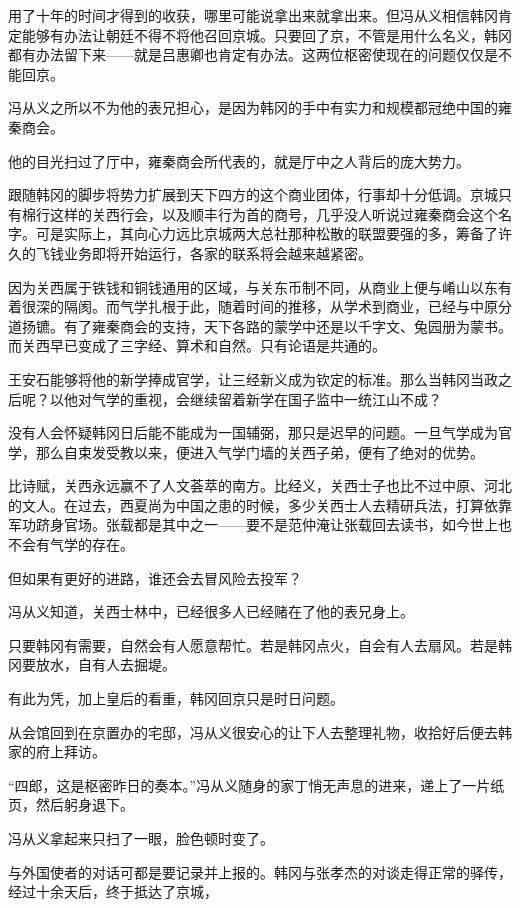 用了十年的时间才得到的收获，哪里可能说拿出来就拿出来。但冯从义相信韩冈肯定能够有办法让朝廷不得不将他召回京城。只要回了京，不管是用什么名义，韩冈都有办法留下来——就是吕惠卿也肯定有办法。这两位枢密使现在的问题仅仅是不能回京。

冯从义之所以不为他的表兄担心，是因为韩冈的手中有实力和规模都冠绝中国的雍秦商会。

他的目光扫过了厅中，雍秦商会所代表的，就是厅中之人背后的庞大势力。

跟随韩冈的脚步将势力扩展到天下四方的这个商业团体，行事却十分低调。京城只有棉行这样的关西行会，以及顺丰行为首的商号，几乎没人听说过雍秦商会这个名字。可是实际上，其向心力远比京城两大总社那种松散的联盟要强的多，筹备了许久的飞钱业务即将开始运行，各家的联系将会越来越紧密。

因为关西属于铁钱和铜钱通用的区域，与关东币制不同，从商业上便与崤山以东有着很深的隔阂。而气学扎根于此，随着时间的推移，从学术到商业，已经与中原分道扬镳。有了雍秦商会的支持，天下各路的蒙学中还是以千字文、兔园册为蒙书。而关西早已变成了三字经、算术和自然。只有论语是共通的。

王安石能够将他的新学捧成官学，让三经新义成为钦定的标准。那么当韩冈当政之后呢？以他对气学的重视，会继续留着新学在国子监中一统江山不成？

没有人会怀疑韩冈日后能不能成为一国辅弼，那只是迟早的问题。一旦气学成为官学，那么自束发受教以来，便进入气学门墙的关西子弟，便有了绝对的优势。

比诗赋，关西永远赢不了人文荟萃的南方。比经义，关西士子也比不过中原、河北的文人。在过去，西夏尚为中国之患的时候，多少关西士人去精研兵法，打算依靠军功跻身官场。张载都是其中之一——要不是范仲淹让张载回去读书，如今世上也不会有气学的存在。

但如果有更好的进路，谁还会去冒风险去投军？

冯从义知道，关西士林中，已经很多人已经赌在了他的表兄身上。

只要韩冈有需要，自然会有人愿意帮忙。若是韩冈点火，自会有人去扇风。若是韩冈要放水，自有人去掘堤。

有此为凭，加上皇后的看重，韩冈回京只是时日问题。

从会馆回到在京置办的宅邸，冯从义很安心的让下人去整理礼物，收拾好后便去韩家的府上拜访。

“四郎，这是枢密昨日的奏本。”冯从义随身的家丁悄无声息的进来，递上了一片纸页，然后躬身退下。

冯从义拿起来只扫了一眼，脸色顿时变了。

与外国使者的对话可都是要记录并上报的。韩冈与张孝杰的对谈走得正常的驿传，经过十余天后，终于抵达了京城，

